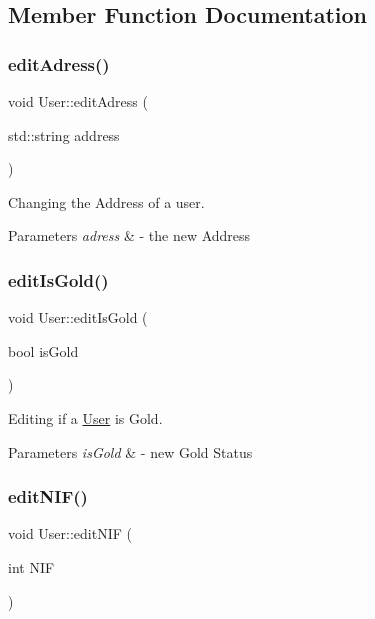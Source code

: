 \subsection{Member Function Documentation}
\mbox{\label{class_user_a9d826d552e81ecc17828be848e02519b}} 
\subsubsection{\texorpdfstring{edit\+Adress()}{editAdress()}}
{\footnotesize\ttfamily void User\+::edit\+Adress (\begin{DoxyParamCaption}\item[{std\+::string}]{address }\end{DoxyParamCaption})}



Changing the Address of a user. 


\begin{DoxyParams}{Parameters}
{\em adress} & -\/ the new Address \\
\hline
\end{DoxyParams}
\mbox{\label{class_user_a092c80f086767a8c204320b6517bfc58}} 
\subsubsection{\texorpdfstring{edit\+Is\+Gold()}{editIsGold()}}
{\footnotesize\ttfamily void User\+::edit\+Is\+Gold (\begin{DoxyParamCaption}\item[{bool}]{is\+Gold }\end{DoxyParamCaption})}



Editing if a \mbox{\hyperlink{class_user}{User}} is Gold. 


\begin{DoxyParams}{Parameters}
{\em is\+Gold} & -\/ new Gold Status \\
\hline
\end{DoxyParams}
\mbox{\label{class_user_a470738d77c8d53ab5c41cdcd74497a82}} 
\subsubsection{\texorpdfstring{edit\+N\+I\+F()}{editNIF()}}
{\footnotesize\ttfamily void User\+::edit\+N\+IF (\begin{DoxyParamCaption}\item[{int}]{N\+IF }\end{DoxyParamCaption})}



